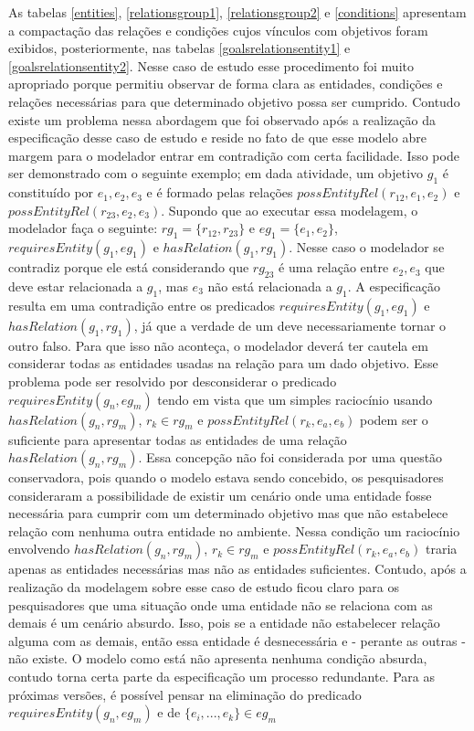 As tabelas \ref{entities}, \ref{relationsgroup1}, \ref{relationsgroup2} e \ref{conditions} apresentam a compactação das relações e condições cujos vínculos com objetivos foram exibidos, posteriormente, nas tabelas \ref{goalsrelationsentity1} e \ref{goalsrelationsentity2}. Nesse caso de estudo esse procedimento foi muito apropriado porque permitiu observar de forma clara as entidades, condições e relações necessárias para que determinado objetivo possa ser cumprido. Contudo existe um problema nessa abordagem que foi observado após a realização da especificação desse caso de estudo e reside no fato de que esse modelo abre margem para o modelador entrar em contradição com certa facilidade. Isso pode ser demonstrado com o seguinte exemplo; em dada atividade, um objetivo $g_1$ é constituído por $e_1,e_2,e_3$ e é formado pelas relações $possEntityRel(r_{12},e_1,e_2)$ e $possEntityRel(r_{23},e_2,e_3)$. Supondo que ao executar essa modelagem, o modelador faça o seguinte: $rg_1 = \{ r_{12},r_{23} \}$ e $ eg_1 = \{ e_1, e_2 \} $, $ requiresEntity(g_1,eg_1) $ e $ hasRelation(g_1, rg_1) $. Nesse caso o modelador se contradiz porque ele está considerando que $rg_{23}$ é uma relação entre $e_2, e_3$ que deve estar relacionada a $g_1$, mas $e_3$ não está relacionada a $g_1$. A especificação resulta em uma contradição entre os predicados $ requiresEntity(g_1,eg_1) $ e $ hasRelation(g_1, rg_1) $, já que a verdade de um deve necessariamente tornar o outro falso. Para que isso não aconteça, o modelador deverá ter cautela em considerar todas as entidades usadas na relação para um dado objetivo. Esse problema pode ser resolvido por desconsiderar o predicado $requiresEntity(g_n,eg_m)$ tendo em vista que um simples raciocínio usando $hasRelation(g_n,rg_m)$, $r_k \in rg_m$ e $possEntityRel(r_k, e_a,e_b)$ podem ser o suficiente para apresentar todas as entidades de uma relação $ hasRelation(g_n, rg_m) $. Essa concepção não foi considerada por uma questão conservadora, pois quando o modelo estava sendo concebido, os pesquisadores consideraram a possibilidade de existir um cenário onde uma entidade fosse necessária para cumprir com um determinado objetivo mas que não estabelece relação com nenhuma outra entidade no ambiente. Nessa condição um raciocínio envolvendo $hasRelation(g_n,rg_m)$, $r_k \in rg_m$ e $possEntityRel(r_k, e_a,e_b)$ traria apenas as entidades necessárias 
mas não as entidades suficientes. Contudo, após a realização da modelagem sobre esse caso de estudo ficou claro para os pesquisadores que uma situação onde uma entidade não se relaciona com as demais é um cenário absurdo. Isso, pois se a entidade não estabelecer relação alguma com as demais, então essa entidade é desnecessária e - perante as outras - não existe. O modelo como está não apresenta nenhuma condição absurda, contudo torna certa parte da especificação um processo redundante. Para as próximas versões, é possível pensar na eliminação do predicado 
$ requiresEntity(g_n,eg_m) $ e de $ \{ e_i , ... , e_k \} \in eg_m $

